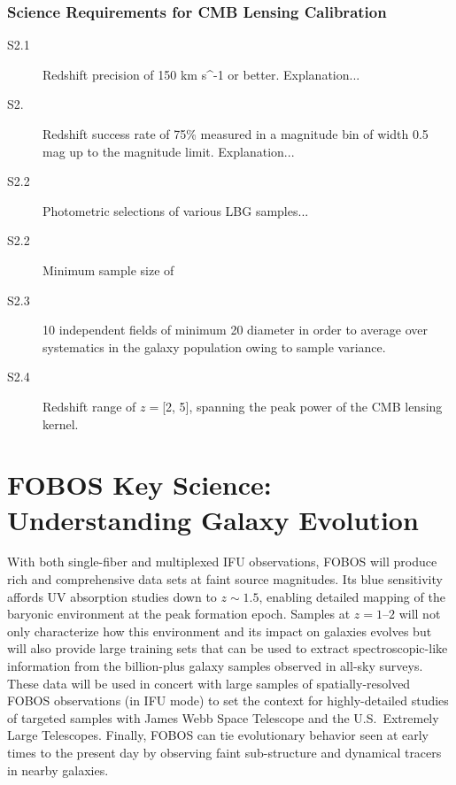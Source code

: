 \documentclass[preprint,11pt]{aastex}
\newcommand{\kms}{{\rm km s^{-1}}}
\begin{document}
\subsubsection{Science Requirements for CMB Lensing Calibration}

\begin{description}

\item[S2.1] Redshift precision of 150 \kms{} or better.  Explanation...

\item[S2.]  Redshift success rate of 75\% measured in a magnitude bin of width 0.5 mag up to the magnitude limit.  Explanation...

\item[S2.2] Photometric selections of various LBG samples...

\item[S2.2] Minimum sample size of 

\item[S2.3] 10 independent fields of minimum 20\arcmin{} diameter in order to average over systematics in the galaxy population owing to sample variance.

\item[S2.4] Redshift range of $z = $[2, 5], spanning the peak power of the CMB lensing kernel.

\end{description}



\newpage
\section{FOBOS Key Science: Understanding Galaxy Evolution} \label{sec:galaxies}

With both single-fiber and multiplexed IFU observations, FOBOS will produce rich and comprehensive data sets at faint source magnitudes.  Its blue sensitivity affords UV absorption studies down to $z \sim 1.5$, enabling detailed mapping of the baryonic environment at the peak formation epoch.  Samples at $z=1$--$2$ will not only characterize how this environment and its impact on galaxies evolves but will also provide large training sets that can be used to extract spectroscopic-like information from the billion-plus galaxy samples observed in all-sky surveys.  These data will be used in concert with large samples of spatially-resolved FOBOS observations (in IFU mode) to set the context for highly-detailed studies of targeted samples with James Webb Space Telescope and the U.S.~Extremely Large Telescopes.  Finally, FOBOS can tie evolutionary behavior seen at early times to the present day by observing faint sub-structure and dynamical tracers in nearby galaxies.
\end{document}
